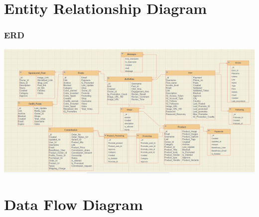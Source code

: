\label{fig:Use case diagram For User}



%




\section{Entity Relationship Diagram}

\subsubsection{ERD }
\includegraphics[scale=0.4]{Diag/database.png}
\label{abc}


%

\section{Data Flow Diagram}


